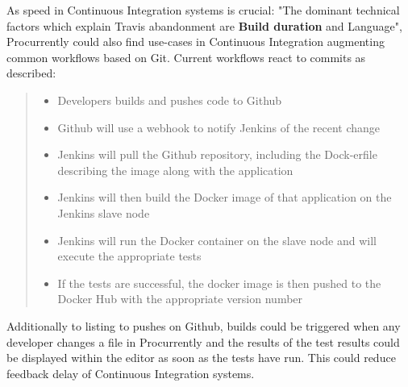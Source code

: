 As speed in Continuous Integration systems is crucial: "The dominant technical factors which explain Travis abandonment are \textbf{Build duration} and Language"\cite{8595199}, Procurrently could also find use-cases in Continuous Integration augmenting common workflows based on Git. 
Current workflows react to commits as described:

\blockquote[{\cite{8695332}}]{
    \begin{itemize}
        \item Developers builds and pushes code to Github
        \item Github will use a webhook to notify Jenkins of the recent change
        \item Jenkins will pull the Github repository, including the Dock-erfile describing the image along with the application
        \item Jenkins will then build the Docker image of that application on the Jenkins slave node
        \item Jenkins will run the Docker container on the slave node and will execute the appropriate tests
        \item If the tests are successful, the docker image is then pushed to the Docker Hub with the appropriate version number
    \end{itemize}
}

\cite{8695332}

Additionally to listing to pushes on Github, builds could be triggered when any developer changes a file in Procurrently and the results of the test results could be displayed within the editor as soon as the tests have run. This could reduce feedback delay of Continuous Integration systems.